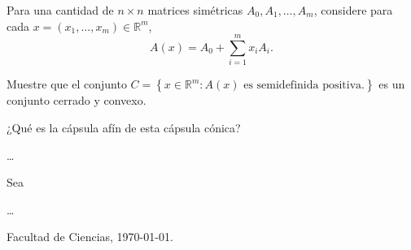 \documentclass{testfcuni} %
\begin{document}
\begin{questions}
  \question

  Para una cantidad de $n\times n$ matrices simétricas
  $A_{0},A_{1},\ldots,A_{m}$, considere para cada
  $x=\left(x_{1},\ldots,x_{m}\right)\in\mathds{R}^{m}$,
  \[
    A\left(x\right)=
    A_{0}+
    \sum_{i=1}^{m}
    x_{i}A_{i}.
  \]

  Muestre que el conjunto
  \begin{math}
    C=
    \left\{
    x\in\mathds{R}^{m}\colon
    A\left(x\right)
    \text{ es semidefinida positiva}.
    \right\}
  \end{math}
  es un conjunto cerrado y convexo.

  ¿Qué es la cápsula afín de esta cápsula cónica?

  \begin{solution}
    \ldots
  \end{solution}

  \question Sea

  \begin{solution}
    \ldots
  \end{solution}

\end{questions}

\begin{flushright}
  Facultad de Ciencias, \today.
\end{flushright}
\end{document}

